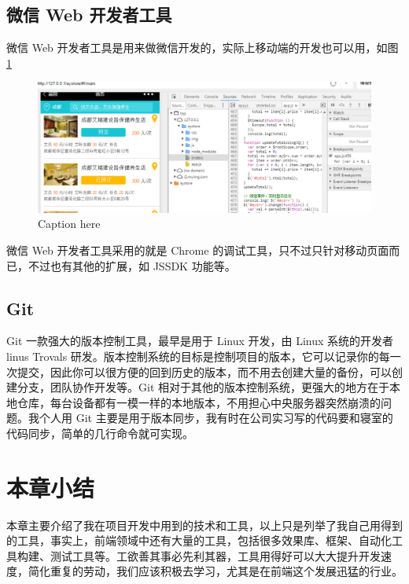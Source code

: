         \subsection{微信 Web 开发者工具}
          \label{subsec:微信_web_开发者工具}
            微信 Web 开发者工具是用来做微信开发的，实际上移动端的开发也可以用，如图 \ref{fig:wxweb}
            \begin{figure}[H]
              \centering
              \includegraphics[width=12cm]{./img/wxweb.png}
              \caption{Caption here}
              \label{fig:wxweb}
            \end{figure}
            微信 Web 开发者工具采用的就是 Chrome 的调试工具，只不过只针对移动页面而已，不过也有其他的扩展，如 JSSDK 功能等。

        \subsection{Git}
          \label{subsec:git}
            Git 一款强大的版本控制工具，最早是用于 Linux 开发，由 Linux 系统的开发者 linus Trovals 研发。版本控制系统的目标是控制项目的版本，它可以记录你的每一次提交，因此你可以很方便的回到历史的版本，而不用去创建大量的备份，可以创建分支，团队协作开发等。Git 相对于其他的版本控制系统，更强大的地方在于本地仓库，每台设备都有一模一样的本地版本，不用担心中央服务器突然崩溃的问题。我个人用 Git 主要是用于版本同步，我有时在公司实习写的代码要和寝室的代码同步，简单的几行命令就可实现。

    \section{本章小结}
      \label{sec:技术与工具小结}
        本章主要介绍了我在项目开发中用到的技术和工具，以上只是列举了我自己用得到的工具，事实上，前端领域中还有大量的工具，包括很多效果库、框架、自动化工具构建、测试工具等。工欲善其事必先利其器，工具用得好可以大大提升开发速度，简化重复的劳动，我们应该积极去学习，尤其是在前端这个发展迅猛的行业。
